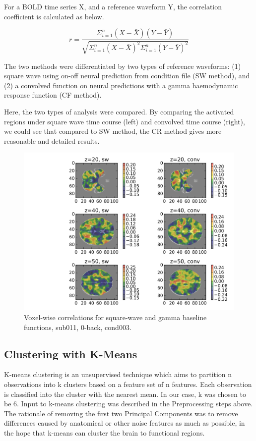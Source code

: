 \documentclass[11pt]{article}
\begin{document}
For a BOLD time series X, and a reference waveform Y, the correlation coefficient is
calculated as below.

\begin{equation}
r = \frac{\Sigma_{i=1}^{n}  ( X-\bar{X}) ( Y-\bar{Y})}{\sqrt{ \Sigma_{i=1}^{n} (
    X-\bar{X} ) ^2 \Sigma_{i=1}^{n} ( Y-\bar{Y})  ^2 }}
\end{equation}

The two methods were differentiated by two types of reference
waveforms: (1) square wave using on-off neural prediction from condition file
(SW method), and (2) a convolved function on neural predictions with a gamma
haemodynamic response function (CF method).

Here, the two types of analysis were compared. By comparing
the activated regions under square wave time course (left) and convolved time
course (right), we could see that compared to SW method, the CR method gives 
more reasonable and detailed results.

\begin{figure}[H]
\centering
\includegraphics[scale=0.7]{../results/sub011_voxel_wise_correlation_across_methods.png}
\caption{Voxel-wise correlations for square-wave and gamma baseline functions, sub011, 0-back, cond003.}
\end{figure} 

\subsection{Clustering with K-Means}

K-means clustering is an unsupervised technique which aims to partition n
observations into k clusters based on a feature set of n features. Each
observation is classified into the cluster with the nearest mean. In our case, k was
chosen to be 6. Input to k-means clustering was described in the Preprocessing steps
above. The rationale of removing the first two Principal Components was to
remove differences caused by anatomical or other noise features as much as possible, in
the hope that k-means can cluster the brain to functional regions.
\end{document}
